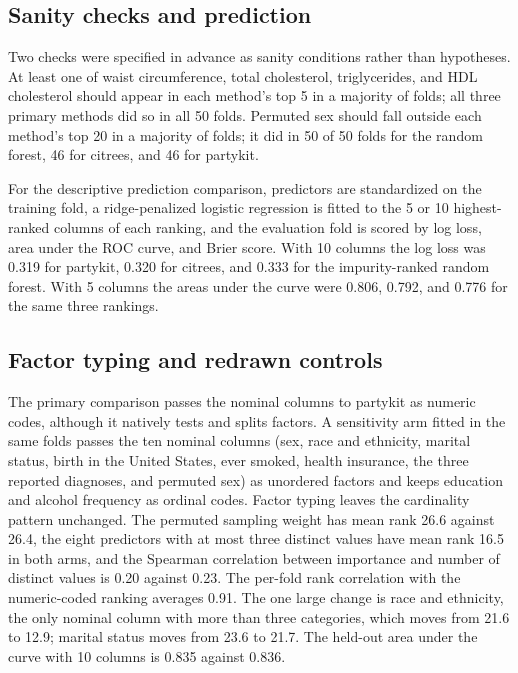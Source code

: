 \documentclass[11pt]{article}
\newcommand{\pkg}[1]{{\normalfont\fontseries{b}\selectfont #1}}
\newcommand{\citrees}{\pkg{citrees}\xspace}
\begin{document}
\subsection{Sanity checks and prediction}

Two checks were specified in advance as sanity conditions rather than
hypotheses. At least one of waist circumference, total cholesterol,
triglycerides, and HDL cholesterol should appear in each method's top 5 in a
majority of folds; all three primary methods did so in all 50 folds. Permuted
sex should fall outside each method's top 20 in a majority of folds; it did
in 50 of 50 folds for the random forest, 46 for \citrees, and 46 for
\pkg{partykit}.

For the descriptive prediction comparison, predictors are standardized on the
training fold, a ridge-penalized logistic regression is fitted to the 5 or 10
highest-ranked columns of each ranking, and the evaluation fold is scored by
log loss, area under the ROC curve, and Brier score. With 10 columns the log
loss was 0.319 for \pkg{partykit}, 0.320 for \citrees, and 0.333 for the
impurity-ranked random forest. With 5 columns the areas under the curve were
0.806, 0.792, and 0.776 for the same three rankings.

\subsection{Factor typing and redrawn controls}

The primary comparison passes the nominal columns to \pkg{partykit} as
numeric codes, although it natively tests and splits factors. A sensitivity
arm fitted in the same folds passes the ten nominal columns (sex, race and
ethnicity, marital status, birth in the United States, ever smoked, health
insurance, the three reported diagnoses, and permuted sex) as unordered
factors and keeps education and alcohol frequency as ordinal codes. Factor
typing leaves the cardinality pattern unchanged. The permuted sampling weight
has mean rank 26.6 against 26.4, the eight predictors with at most three
distinct values have mean rank 16.5 in both arms, and the Spearman
correlation between importance and number of distinct values is 0.20 against
0.23. The per-fold rank correlation with the numeric-coded ranking averages
0.91. The one large change is race and ethnicity, the only nominal column
with more than three categories, which moves from 21.6 to 12.9; marital
status moves from 23.6 to 21.7. The held-out area under the curve with 10
columns is 0.835 against 0.836.
\end{document}
